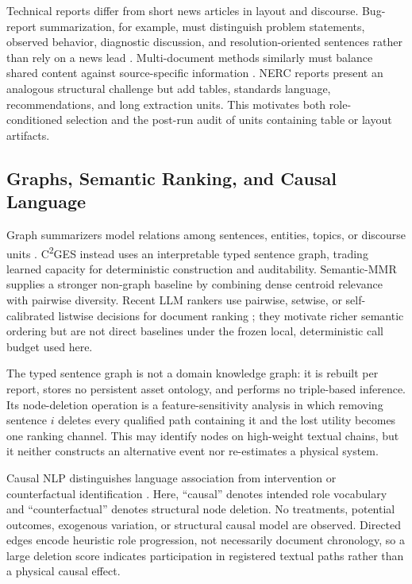 \documentclass[applsci,article,submit,moreauthors]{Definitions/mdpi}
\newcommand{\cges}{C\textsuperscript{2}GES}
\begin{document}
Technical reports differ from short news articles in layout and discourse. Bug-report summarization, for example, must distinguish problem statements, observed behavior, diagnostic discussion, and resolution-oriented sentences rather than rely on a news lead \cite{koh2022bugreport}. Multi-document methods similarly must balance shared content against source-specific information \cite{zhang2024tomds}. NERC reports present an analogous structural challenge but add tables, standards language, recommendations, and long extraction units. This motivates both role-conditioned selection and the post-run audit of units containing table or layout artifacts.

\subsection{Graphs, Semantic Ranking, and Causal Language}

Graph summarizers model relations among sentences, entities, topics, or discourse units \cite{wang2020heterogeneous,cui2020enhancing,jing2021multiplex}. \cges{} instead uses an interpretable typed sentence graph, trading learned capacity for deterministic construction and auditability. Semantic-MMR supplies a stronger non-graph baseline by combining dense centroid relevance with pairwise diversity. Recent LLM rankers use pairwise, setwise, or self-calibrated listwise decisions for document ranking \cite{qin2024pairwise,zhuang2024setwise,ren2025selfcalibrated}; they motivate richer semantic ordering but are not direct baselines under the frozen local, deterministic call budget used here.

The typed sentence graph is not a domain knowledge graph: it is rebuilt per report, stores no persistent asset ontology, and performs no triple-based inference. Its node-deletion operation is a feature-sensitivity analysis in which removing sentence $i$ deletes every qualified path containing it and the lost utility becomes one ranking channel. This may identify nodes on high-weight textual chains, but it neither constructs an alternative event nor re-estimates a physical system.

Causal NLP distinguishes language association from intervention or counterfactual identification \cite{feder2022causal,du2022ecare}. Here, ``causal'' denotes intended role vocabulary and ``counterfactual'' denotes structural node deletion. No treatments, potential outcomes, exogenous variation, or structural causal model are observed. Directed edges encode heuristic role progression, not necessarily document chronology, so a large deletion score indicates participation in registered textual paths rather than a physical causal effect.
\end{document}

